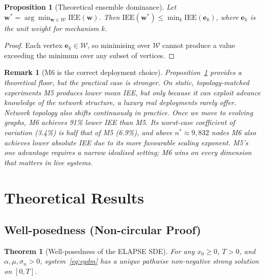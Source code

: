 \documentclass[conference]{IEEEtran}
\newcommand{\bfw}{\mathbf{w}}
\newcommand{\IEE}{\mathrm{IEE}}
\newtheorem{theorem}{Theorem}
\newtheorem{proposition}{Proposition}
\newtheorem{remark}{Remark}
\begin{document}
\begin{proposition}[Theoretical ensemble dominance]
\label{prop:dominance}
Let $\bfw^*=\arg\min_{\bfw\in\mathcal{W}}\IEE(\bfw)$.  Then
$\IEE(\bfw^*)\leq\min_k \IEE(\mathbf{e}_k)$,
where $\mathbf{e}_k$ is the unit weight for mechanism $k$.
\end{proposition}
\begin{proof}
Each vertex $\mathbf{e}_k\in\mathcal{W}$, so minimising over
$\mathcal{W}$ cannot produce a value exceeding the minimum over
any subset of vertices.
\end{proof}

\begin{remark}[M6 is the correct deployment choice]
\label{rem:m6wins}
Proposition~\ref{prop:dominance} provides a theoretical floor, but
the practical case is stronger.  On static, topology-matched
experiments M5 produces lower mean IEE, but only because it can
exploit advance knowledge of the network structure, a luxury real
deployments rarely offer.  Network topology also shifts continuously
in practice.  Once we move to evolving graphs, M6 achieves 91\%
lower IEE than M5.  Its worst-case coefficient of variation (3.4\%)
is half that of M5 (6.9\%), and above $n^*\approx 9{,}832$ nodes
M6 also achieves lower absolute IEE due to its more favourable
scaling exponent.  M5's one advantage requires a narrow idealised
setting; M6 wins on every dimension that matters in live systems.
\end{remark}

\section{Theoretical Results}
\label{sec:theory}

\subsection{Well-posedness (Non-circular Proof)}

\begin{theorem}[Well-posedness of the ELAPSE SDE]
\label{thm:wellposed}
For any $x_0\geq 0$, $T>0$, and $\alpha,\mu,\sigma_n>0$,
system~\eqref{eq:egdm} has a unique pathwise non-negative strong
solution on $[0,T]$.
\end{theorem}
\end{document}
